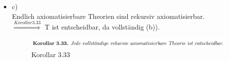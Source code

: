 \documentclass[a4paper]{scrartcl}%
\begin{document}
\begin{itemize}
\begin{itemize}
\begin{itemize}
                        \item Fall 1: $b' > F(a), \forall a \in Dom(F):\\
                            \text{Dann suche ein }a' \in A: a' > a, \forall a \in Dom(F) \text{ (Geht immer, da keine Endpunkte)}\\
                            \text{ und bilde wie folgt ab: } a' \mapsto b'$\\
                        \item Fall 2: $b' < F(a), \forall a \in Dom(F)$ ist analog.\\
                        \item Fall 3: Sonst\\
                            Gelten die beiden Fälle, gibt es kleinere und größere Elemente als b'.\\
                            Wir wählen $a_1,a_2 \in Dom(F) \text{ so, dass gilt: } F(a_1) < b' < F(a_2)$\\
                            und $F(a_1)$ möglichst groß und $F(a_2)$ möglichst klein ist.\\
                            Dann wähle $a' \in A (=A\backslash Dom(F)): a_1 < a' < a_2$ (Geht immer, da dicht)\\
                            Und bilde $a' \mapsto b'$ ab.\\
                    \end{itemize}
                     ist analog.\\
            \end{itemize}
            Damit sind alle Modelle elementar äquivalent $\Rightarrow$ T ist vollständig.\\
        \item c)\\
            Endlich axiomatisierbare Theorien sind rekursiv axiomatisierbar.\\
            $\overset{Korollar 3.33}{\Rightarrow}$ T ist entscheidbar, da vollständig (b)).\\

            \begin{figure}[H]
                \centering
                \includegraphics[scale=0.3]{./K-3-33.png}
                \caption{Korollar 3.33}
                \label{fig:./K-3-33}
            \end{figure}
            

    \end{itemize}
\end{document}
